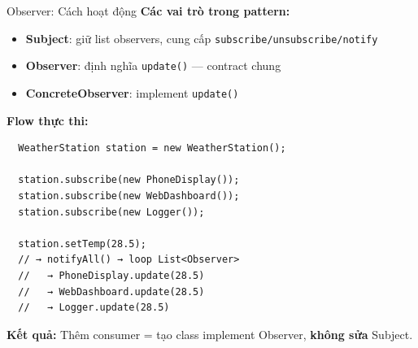 \begin{frame}[fragile]{Observer: Cách hoạt động}
  \textbf{Các vai trò trong pattern:}
  \begin{itemize}
    \item \textcolor{myblue}{\textbf{Subject}}: giữ list observers, cung cấp \texttt{subscribe/unsubscribe/notify}
    \item \textcolor{mygreen}{\textbf{Observer}}: định nghĩa \texttt{update()} --- contract chung
    \item \textcolor{mypurple}{\textbf{ConcreteObserver}}: implement \texttt{update()}
  \end{itemize}

  \vspace{0.2em}
  \textbf{Flow thực thi:}
  \footnotesize
  \begin{verbatim}
  WeatherStation station = new WeatherStation();

  station.subscribe(new PhoneDisplay());
  station.subscribe(new WebDashboard());
  station.subscribe(new Logger());

  station.setTemp(28.5);
  // → notifyAll() → loop List<Observer>
  //   → PhoneDisplay.update(28.5)
  //   → WebDashboard.update(28.5)
  //   → Logger.update(28.5)
  \end{verbatim}

  \textcolor{mygreen}{\textbf{Kết quả:}} Thêm consumer = tạo class implement Observer, \textbf{không sửa} Subject.
\end{frame}

